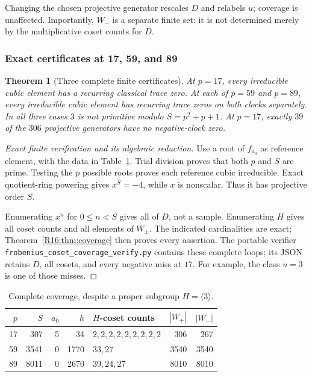 \documentclass[11pt,a4paper]{article}
\newtheorem{theorem}{Theorem}[section]
\theoremstyle{definition}\newtheorem{definition}[theorem]{Definition}
\theoremstyle{remark}\newtheorem{remark}[theorem]{Remark}
\begin{document}
Changing the chosen projective generator rescales $D$ and relabels $u$;
coverage is unaffected. Importantly, $W_-$ is a separate finite set: it is
not determined merely by the multiplicative coset counts for $D$.

\subsubsection{Exact certificates at 17, 59, and 89}

\begin{theorem}[Three complete finite certificates]\label{R16:thm:three}
At $p=17$, every irreducible cubic element has a recurring classical trace
zero. At each of $p=59$ and $p=89$, every irreducible cubic element has
recurring trace zeros on \emph{both clocks separately}. In all three cases
$3$ is not primitive modulo $S=p^2+p+1$.
At $p=17$, exactly $39$ of the $306$ projective generators have no
negative-clock zero.
\end{theorem}
\begin{proof}[Exact finite verification and its algebraic reduction]
Use a root of $f_{a_0}$ as reference element, with the data in
Table~\ref{R16:tab:coverage}. Trial division proves that both $p$ and $S$ are
prime. Testing the $p$ possible roots proves each reference cubic
irreducible. Exact quotient-ring powering gives $x^S=-4$, while $x$ is
nonscalar. Thus it has projective order $S$.

Enumerating $x^n$ for $0\le n<S$ gives all of $D$, not a sample.
Enumerating $H$ gives all coset counts and all elements of $W_\pm$.
The indicated cardinalities are exact; Theorem~\ref{R16:thm:coverage} then
proves every assertion. The portable verifier
\texttt{frobenius\_coset\_coverage\_verify.py} contains these complete loops;
its JSON retains $D$, all cosets, and every negative miss at $17$.
For example, the class $u=3$ is one of those misses.
\end{proof}

\begin{table}[ht]
\centering\small
\begin{tabular}{rrrrlrr}
\toprule
$p$&$S$&$a_0$&$h$&$H$-coset counts&$|W_+|$&$|W_-|$\\
\midrule
17&307&5&34&$2,2,2,2,2,2,2,2,2$&306&267\\
59&3541&0&1770&$33,27$&3540&3540\\
89&8011&0&2670&$39,24,27$&8010&8010\\
\bottomrule
\end{tabular}
\caption{Complete coverage, despite a proper subgroup $H=\langle3\rangle$.}
\label{R16:tab:coverage}
\end{table}
\end{document}
